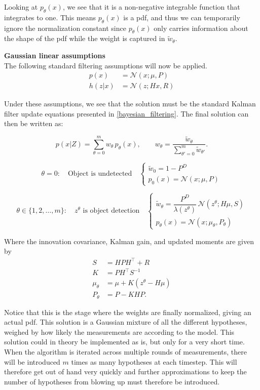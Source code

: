Looking at $p_\theta(x)$, we see that it is a non-negative integrable function that integrates to one. This means $p_\theta(x)$ is a pdf, and thus we can temporarily ignore the normalization constant since $p_\theta(x)$ only carries information about the shape of the pdf while the weight is captured in $\tilde{w}_\theta$.

\textbf{Gaussian linear assumptions} \\
The following standard filtering assumptions will now be applied.
\begin{align*}
    p(x) &= \mathcal{N}(x; \mu, P) \\
    h(z \vert x) &= \mathcal{N}(z; Hx, R)
\end{align*}

Under these assumptions, we see that the solution must be the standard Kalman filter update equations presented in \autoref{bayesian_filtering}. The final solution can then be written as:

\[
p(x \vert Z) = \sum_{\theta=0}^{m} w_\theta \, p_\theta(x), \qquad
w_\theta = \dfrac{\tilde{w}_\theta}{\displaystyle\sum_{\theta'=0}^{m} \tilde{w}_{\theta'}}.
\]

\[
\theta = 0: \quad \text{Object is undetected} \quad
\begin{cases}
\tilde{w}_0 = 1 - P^D \\[2mm]
p_0(x) = \mathcal{N}(x; \mu, P)
\end{cases}
\]

\[
\theta \in \{1, 2, \ldots, m\}: \quad z^\theta \text{ is object detection} \quad
\begin{cases}
\tilde{w}_\theta = \dfrac{P^D}{\lambda(z^\theta)} \, \mathcal{N}(z^\theta; H\mu, S) \\[2mm]
p_\theta(x) = \mathcal{N}(x; \mu_\theta, P_\theta)
\end{cases}
\]

Where the innovation covariance, Kalman gain, and updated moments are given by
\begin{align*}
    S &= HPH^\top + R \\
    K &= PH^\top S^{-1} \\
    \mu_\theta &= \mu + K\left(z^\theta - H\mu\right) \\
    P_\theta &= P - KHP.
\end{align*}

Notice that this is the stage where the weights are finally normalized, giving an actual pdf. This solution is a Gaussian mixture of all the different hypotheses, weighed by how likely the measurements are according to the model. This solution could in theory be implemented as is, but only for a very short time. When the algorithm is iterated across multiple rounds of measurements, there will be introduced $m$ times as many hypotheses at each timestep. This will therefore get out of hand very quickly and further approximations to keep the number of hypotheses from blowing up must therefore be introduced.

